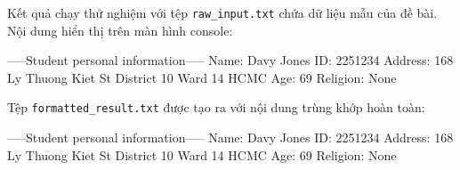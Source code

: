 
Kết quả chạy thử nghiệm với tệp \texttt{raw\_input.txt} chứa dữ liệu mẫu của đề bài. Nội dung hiển thị trên màn hình console:

\begin{codeblock}[language={}]
-----Student personal information-----
Name: Davy Jones
ID: 2251234
Address: 168 Ly Thuong Kiet St District 10 Ward 14 HCMC
Age: 69
Religion: None
\end{codeblock}

Tệp \texttt{formatted\_result.txt} được tạo ra với nội dung trùng khớp hoàn toàn:

\begin{codeblock}[language={}]
-----Student personal information-----
Name: Davy Jones
ID: 2251234
Address: 168 Ly Thuong Kiet St District 10 Ward 14 HCMC
Age: 69
Religion: None
\end{codeblock}

